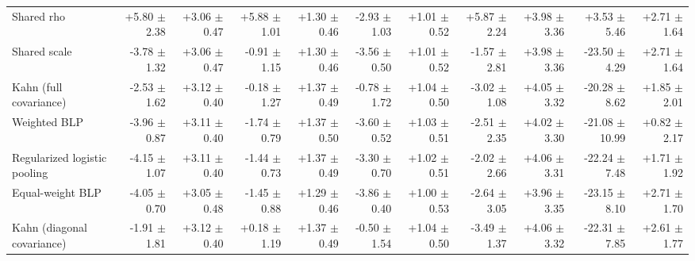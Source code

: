 \begin{tabular}{lrrrrrrrrrr}
Shared rho & +5.80 {\scriptsize $\pm$ 2.38} & +3.06 {\scriptsize $\pm$ 0.47} & +5.88 {\scriptsize $\pm$ 1.01} & +1.30 {\scriptsize $\pm$ 0.46} & -2.93 {\scriptsize $\pm$ 1.03} & +1.01 {\scriptsize $\pm$ 0.52} & +5.87 {\scriptsize $\pm$ 2.24} & +3.98 {\scriptsize $\pm$ 3.36} & +3.53 {\scriptsize $\pm$ 5.46} & +2.71 {\scriptsize $\pm$ 1.64} \\
Shared scale & -3.78 {\scriptsize $\pm$ 1.32} & +3.06 {\scriptsize $\pm$ 0.47} & -0.91 {\scriptsize $\pm$ 1.15} & +1.30 {\scriptsize $\pm$ 0.46} & -3.56 {\scriptsize $\pm$ 0.50} & +1.01 {\scriptsize $\pm$ 0.52} & -1.57 {\scriptsize $\pm$ 2.81} & +3.98 {\scriptsize $\pm$ 3.36} & -23.50 {\scriptsize $\pm$ 4.29} & +2.71 {\scriptsize $\pm$ 1.64} \\
Kahn (full covariance) & -2.53 {\scriptsize $\pm$ 1.62} & +3.12 {\scriptsize $\pm$ 0.40} & -0.18 {\scriptsize $\pm$ 1.27} & +1.37 {\scriptsize $\pm$ 0.49} & -0.78 {\scriptsize $\pm$ 1.72} & +1.04 {\scriptsize $\pm$ 0.50} & -3.02 {\scriptsize $\pm$ 1.08} & +4.05 {\scriptsize $\pm$ 3.32} & -20.28 {\scriptsize $\pm$ 8.62} & +1.85 {\scriptsize $\pm$ 2.01} \\
Weighted BLP & -3.96 {\scriptsize $\pm$ 0.87} & +3.11 {\scriptsize $\pm$ 0.40} & -1.74 {\scriptsize $\pm$ 0.79} & +1.37 {\scriptsize $\pm$ 0.50} & -3.60 {\scriptsize $\pm$ 0.52} & +1.03 {\scriptsize $\pm$ 0.51} & -2.51 {\scriptsize $\pm$ 2.35} & +4.02 {\scriptsize $\pm$ 3.30} & -21.08 {\scriptsize $\pm$ 10.99} & +0.82 {\scriptsize $\pm$ 2.17} \\
Regularized logistic pooling & -4.15 {\scriptsize $\pm$ 1.07} & +3.11 {\scriptsize $\pm$ 0.40} & -1.44 {\scriptsize $\pm$ 0.73} & +1.37 {\scriptsize $\pm$ 0.49} & -3.30 {\scriptsize $\pm$ 0.70} & +1.02 {\scriptsize $\pm$ 0.51} & -2.02 {\scriptsize $\pm$ 2.66} & +4.06 {\scriptsize $\pm$ 3.31} & -22.24 {\scriptsize $\pm$ 7.48} & +1.71 {\scriptsize $\pm$ 1.92} \\
Equal-weight BLP & -4.05 {\scriptsize $\pm$ 0.70} & +3.05 {\scriptsize $\pm$ 0.48} & -1.45 {\scriptsize $\pm$ 0.88} & +1.29 {\scriptsize $\pm$ 0.46} & -3.86 {\scriptsize $\pm$ 0.40} & +1.00 {\scriptsize $\pm$ 0.53} & -2.64 {\scriptsize $\pm$ 3.05} & +3.96 {\scriptsize $\pm$ 3.35} & -23.15 {\scriptsize $\pm$ 8.10} & +2.71 {\scriptsize $\pm$ 1.70} \\
Kahn (diagonal covariance) & -1.91 {\scriptsize $\pm$ 1.81} & +3.12 {\scriptsize $\pm$ 0.40} & +0.18 {\scriptsize $\pm$ 1.19} & +1.37 {\scriptsize $\pm$ 0.49} & -0.50 {\scriptsize $\pm$ 1.54} & +1.04 {\scriptsize $\pm$ 0.50} & -3.49 {\scriptsize $\pm$ 1.37} & +4.06 {\scriptsize $\pm$ 3.32} & -22.31 {\scriptsize $\pm$ 7.85} & +2.61 {\scriptsize $\pm$ 1.77} \\

\end{tabular}

